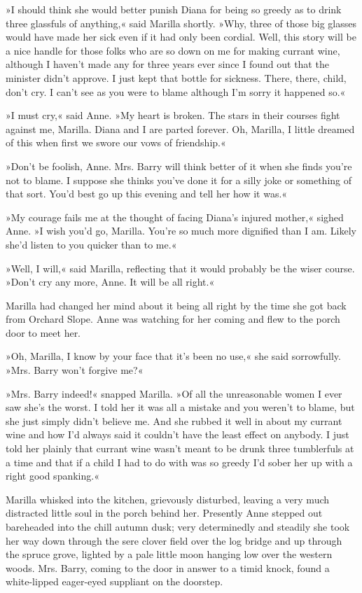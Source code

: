 »I should think she would better punish Diana for being so greedy as to drink three glassfuls of anything,« said Marilla shortly. »Why, three of those big glasses would have made her sick even if it had only been cordial. Well, this story will be a nice handle for those folks who are so down on me for making currant wine, although I haven't made any for three years ever since I found out that the minister didn't approve. I just kept that bottle for sickness. There, there, child, don't cry. I can't see as you were to blame although I'm sorry it happened so.«

»I must cry,« said Anne. »My heart is broken. The stars in their courses fight against me, Marilla. Diana and I are parted forever. Oh, Marilla, I little dreamed of this when first we swore our vows of friendship.«

»Don't be foolish, Anne. Mrs. Barry will think better of it when she finds you're not to blame. I suppose she thinks you've done it for a silly joke or something of that sort. You'd best go up this evening and tell her how it was.«

»My courage fails me at the thought of facing Diana's injured mother,« sighed Anne. »I wish you'd go, Marilla. You're so much more dignified than I am. Likely she'd listen to you quicker than to me.«

»Well, I will,« said Marilla, reflecting that it would probably be the wiser course. »Don't cry any more, Anne. It will be all right.«

Marilla had changed her mind about it being all right by the time she got back from Orchard Slope. Anne was watching for her coming and flew to the porch door to meet her.

»Oh, Marilla, I know by your face that it's been no use,« she said sorrowfully. »Mrs. Barry won't forgive me?«

»Mrs. Barry indeed!« snapped Marilla. »Of all the unreasonable women I ever saw she's the worst. I told her it was all a mistake and you weren't to blame, but she just simply didn't believe me. And she rubbed it well in about my currant wine and how I'd always said it couldn't have the least effect on anybody. I just told her plainly that currant wine wasn't meant to be drunk three tumblerfuls at a time and that if a child I had to do with was so greedy I'd sober her up with a right good spanking.«

Marilla whisked into the kitchen, grievously disturbed, leaving a very much distracted little soul in the porch behind her. Presently Anne stepped out bareheaded into the chill autumn dusk; very determinedly and steadily she took her way down through the sere clover field over the log bridge and up through the spruce grove, lighted by a pale little moon hanging low over the western woods. Mrs. Barry, coming to the door in answer to a timid knock, found a white-lipped eager-eyed suppliant on the doorstep.

